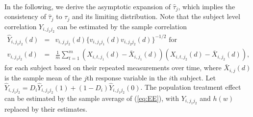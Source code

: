 \documentclass[12pt]{article}
\def\bea{\begin{eqnarray}}
\def\eea{\end{eqnarray}}
\def\nn{\nonumber}
\def\T{{ \mathrm{\scriptscriptstyle T} }}
\theoremstyle{definition}
\newcommand{\E}{\rm E}
\newcommand{\bW}{{\mathbf W}}
\newcommand{\bY}{{\mathbf Y}}
\newcommand{\bbeta}  {\boldsymbol{\beta}}
\begin{document}
In the following, we derive the asymptotic expansion of $\hat{\tau}_j$, which implies the consistency of $\hat{\tau}_j$ to $\tau_j$ and its limiting distribution.
%
%
\iffalse
Note that the subject level correlation $Y_{i, j_1j_2}$ can be estimated by the sample correlation 
\bea
\hat{Y}_{i, j_1j_2}(d) &=& v_{i, j_1j_2}(d) \{v_{i, j_1j_1}(d) v_{i, j_2j_2}(d)\}^{-1/2} \mbox{ \ for } \label{eq:EstCorr} \\
v_{i, j_1j_2}(d) &=& \frac{1}{m}\sum_{t = 1}^{m} (X_{i, t, j_1}(d) - \bar{X}_{i, j_1}(d))(X_{i, t, j_2}(d) - \bar{X}_{i, j_2}(d)), \nn
\eea
for each subject
based on their repeated measurements over time, where $\bar{X}_{i, j}(d)$ is the sample mean of the $j$th response variable in the $i$th subject.
Let $\hat{Y}_{i, j_1j_2} = D_{i}\hat{Y}_{i, j_1j_2}(1) + (1 - D_{i})\hat{Y}_{i, j_1j_2}(0)$.
The population treatment effect can be estimated by the sample average of (\ref{eq:EE}), with $Y_{i, j_1j_2}$ and $h(w)$ replaced by their estimates.
\end{document}
